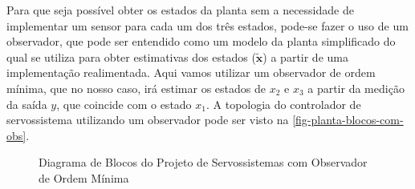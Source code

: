\documentclass[
	12pt,				%
	article,			%
	openright,			%
	oneside,
	a4paper,			%
	chapter=TITLE,		%
	section=TITLE,		%
	english,			%
	french,				%
	spanish,			%
	brazil,				%
]{abntex2}
\begin{document}
                Para que seja possível obter os estados da planta sem a necessidade de implementar um sensor para cada um dos três estados, pode-se fazer o uso de um observador, que pode ser entendido como um modelo da planta simplificado do qual se utiliza para obter estimativas dos estados ($\boldsymbol{\tilde{x}}$) a partir de uma implementação realimentada. Aqui vamos utilizar um observador de ordem mínima, que no nosso caso, irá estimar os estados de $x_2$ e $x_3$ a partir da medição da saída $y$, que coincide com o estado $x_1$. A topologia do controlador de servossistema utilizando um observador pode ser visto na \autoref{fig-planta-blocos-com-obs}.
                
                \begin{figure}[htbp]
                    \centering
                    \caption{Diagrama de Blocos do Projeto de Servossistemas com Observador de Ordem Mínima}
                    \label{fig-planta-blocos-com-obs}
\end{figure}
\end{document}
